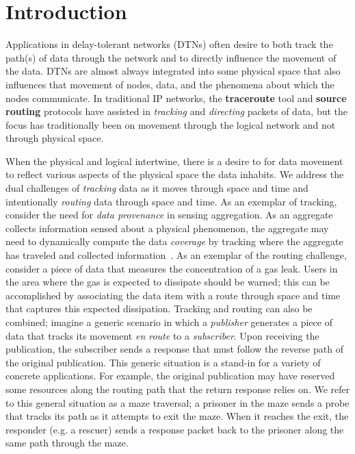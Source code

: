 %
%
\section{Introduction}
Applications in delay-tolerant networks (DTNs) often desire to both track the path(s) of data through the network and to directly influence the movement of the data. DTNs are almost always integrated into some physical space that also influences that movement of nodes, data, and the phenomena about which the nodes communicate. In traditional IP networks, the {\bf traceroute} tool and {\bf source routing} protocols have assisted in {\em tracking} and {\em directing} packets of data, but the focus has traditionally been on movement through the logical network and not through physical space.

When the physical and logical intertwine, there is a desire to for data movement to reflect various aspects of the physical space the data inhabits. We address the dual challenges of {\em tracking} data as it moves through space and time and intentionally {\em routing} data through space and time. As an exemplar of tracking, consider the need for {\em data provenance} in sensing aggregation. As an aggregate collects information sensed about a physical phenomenon, the aggregate may need to dynamically compute the data {\em coverage} by tracking where the aggregate has traveled and collected information~\cite{michel12:spatiotemporal}. As an exemplar of the routing challenge, consider a piece of data that measures the concentration of a gas leak. Users in the area where the gas is expected to dissipate should be warned; this can be accomplished by associating the data item with a route through space and time that captures this expected dissipation. Tracking and routing can also be combined; imagine a generic scenario in which a {\em publisher} generates a piece of data that tracks its movement {\em en route} to a {\em subscriber}. Upon receiving the publication, the subscriber sends a response that must follow the reverse path of the original publication. This generic situation is a stand-in for a variety of concrete applications. For example, the original publication may have reserved some resources along the routing path that the return response relies on. We refer to this general situation as a maze traversal; a prisoner in the maze sends a probe that tracks its path as it attempts to exit the maze. When it reaches the exit, the responder (e.g. a rescuer) sends a response packet back to the prisoner along the same path through the maze.

